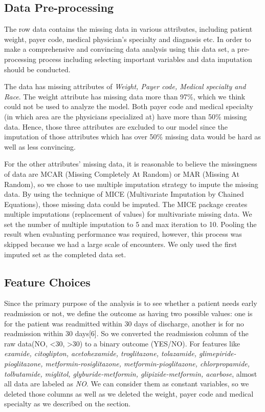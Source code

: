 \documentclass[twoside,11pt]{article}
\begin{document}
\subsection{Data Pre-processing} 
The row data contains the missing data in various attributes, including patient weight, payer code, medical physician's specialty and diagnosis etc. In order to make a comprehensive and convincing data analysis using this data set, a pre-processing process including selecting important variables and data imputation should be conducted.

The data has missing attributes of \emph{Weight, Payer code, Medical specialty and Race}. The weight attribute has missing data more than 97\%, which we think could not be used to analyze the model. Both payer code and medical specialty (in which area are the physicians specialized at) have more than 50\% missing data. Hence, those three attributes are excluded to our model since the imputation of those attributes which has over 50\% missing data would be hard as well as less convincing.    

For the other attributes' missing data, it is reasonable to believe the missingness of data are MCAR (Missing Completely At Random) or MAR (Missing At Random), so we chose to use multiple imputation strategy to impute the missing data. By using the technique of MICE (Multivariate Imputation by Chained Equations), those missing data could be imputed. The MICE package creates multiple imputations (replacement of values) for multivariate missing data. We set the number of multiple imputation to 5 and max iteration to 10. Pooling the result when evaluating performance was required, however, this process was skipped because we had a large scale of encounters. We only used the first imputed set as the completed data set.  






\subsection{Feature Choices} 
Since the primary purpose of the analysis is to see whether a patient needs early readmission or not, we define the outcome as having two possible values: one is for the patient was readmitted within 30 days of discharge, another is for no readmission within 30 days[6]. So we converted the readmission column of the raw data(NO, \textless30, \textgreater30) to a binary outcome (YES/NO). For features like \textit{examide, citoglipton, acetohexamide, troglitazone, tolazamide, glimepiride-pioglitazone,  metformin-rosiglitazone, metformin-pioglitazone, chlorpropamide, tolbutamide, miglitol, glyburide-metformin, glipizide-metformin, acarbose}, almost all data are labeled as \emph{NO}. We can consider them as constant variables, so we deleted those columns as well as we deleted the weight, payer code and medical specialty as we described on the section.  
\end{document}
